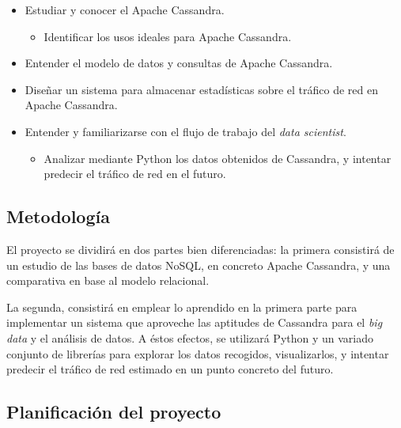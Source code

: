 \begin{itemize}
    \item Estudiar y conocer el Apache Cassandra.
      \begin{itemize}
      \item Identificar los usos ideales para Apache Cassandra.
      \end{itemize}
    \item Entender el modelo de datos y consultas de Apache Cassandra.
    \item Diseñar un sistema para almacenar estadísticas sobre el tráfico de red
      en Apache Cassandra.
    \item Entender y familiarizarse con el flujo de trabajo del \emph{data scientist}.
      \begin{itemize}
      \item Analizar mediante Python los datos obtenidos de Cassandra, y
        intentar predecir el tráfico de red en el futuro.
      \end{itemize}
\end{itemize}

\subsection{Metodología}
\label{subsec:metodologia}

El proyecto se dividirá en dos partes bien diferenciadas: la primera consistirá
de un estudio de las bases de datos NoSQL, en concreto Apache Cassandra, y una
comparativa en base al modelo relacional.

La segunda, consistirá en emplear lo aprendido en la primera parte para
implementar un sistema que aproveche las aptitudes de Cassandra para el
\emph{big data} y el análisis de datos. A éstos efectos, se utilizará Python y
un variado conjunto de librerías para explorar los datos recogidos,
visualizarlos, y intentar predecir el tráfico de red estimado en un punto
concreto del futuro.



\subsection{Planificación del proyecto}
\label{subsec:planificació}


